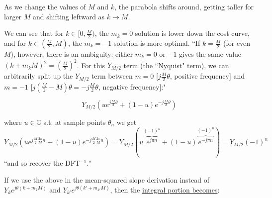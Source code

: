 \documentclass[10pt]{article}
\begin{document}
\begin{center}
\end{center}

As we change the values of $M$ and $k$, the parabola shifts around, getting taller for larger $M$ and shifting leftward as $k \rightarrow M$.

We can see that for $k \in [0, \frac{M}{2})$, the $m_k = 0$ solution is lower down the cost curve, and for $k \in (\frac{M}{2}, M)$, the $m_k = -1$ solution is more optimal. ``If $k = \frac{M}{2}$ (for even $M$), however, there is an ambiguity: either $m_k = 0$ or $-1$ gives the same value $(k + m_k M)^2 = (\frac{M}{2})^2$. For this $Y_{M/2}$ term (the ``Nyquist" term), we can arbitrarily split up the $Y_{M/2}$ term between $m = 0$ [$j\frac{M}{2}\theta$, positive frequency] and $m = -1$ [$j(\frac{M}{2} - M)\theta = -j\frac{M}{2}\theta$, negative frequency]:"

$$Y_{M/2}(ue^{j\frac{M}{2}\theta} + (1 - u)e^{-j\frac{M}{2}\theta})$$\vspace{-7mm}

\noindent where $u \in \mathbb{C}$ s.t. at sample points $\theta_n$ we get $Y_{M/2}(ue^{j\frac{M}{2}\frac{2\pi}{M}n} + (1-u)e^{-j\frac{M}{2}\frac{2\pi}{M}n}) = Y_{M/2}(u\overbrace{e^{j\pi n}}^{(-1)^n} + (1-u)\overbrace{e^{-j\pi n}}^{(-1)^n}) = Y_{M/2}(-1)^n$ ``and so recover the DFT$^{-1}$."

If we use the above in the mean-squared slope derivation instead of $Y_k e^{j \theta (k + m_k M)}$ and $Y_{k'} e^{j \theta (k' + m_{k'} M)}$, then the \href{https://math.stackexchange.com/a/5013632/278341}{integral portion becomes}:\vspace{-5mm}
\end{document}
